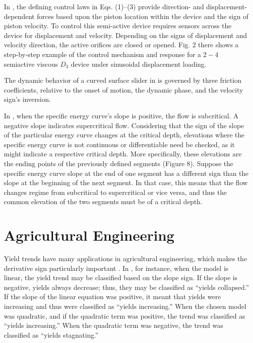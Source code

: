 \documentclass[11pt]{book}
\begin{document}
In \cite{hazaveh2017experimental}, the defining control laws in Eqs.
(1)--(3) provide direction- and displacement-dependent forces based
upon the piston location within the device and the sign of piston
velocity. To control this semi-active device requires sensors across
the device for displacement and velocity. Depending on the signs of
displacement and velocity direction, the active orifices are closed
or opened. Fig. 2 there shows a step-by-step example of the control
mechanism and response for a $2-4$ semiactive viscous $D_{3}$ device
under sinusoidal displacement loading.

The dynamic behavior of a curved surface slider in \cite{saitta2018base}
is governed by three friction coefficients, relative to the onset
of motion, the dynamic phase, and the velocity sign's inversion.

In \cite{petikas2020calculation}, when the specific energy curve's
slope is positive, the flow is subcritical. A negative slope indicates
supercritical flow. Considering that the sign of the slope of the
particular energy curve changes at the critical depth, elevations
where the specific energy curve is not continuous or differentiable
need be checked, as it might indicate a respective critical depth.
More specifically, these elevations are the ending points of the previously
defined segments (Figure 8). Suppose the specific energy curve slope
at the end of one segment has a different sign than the slope at the
beginning of the next segment. In that case, this means that the flow
changes regime from subcritical to supercritical or vice versa, and
thus the common elevation of the two segments must be of a critical
depth.


\section{Agricultural Engineering}
Yield trends have many applications in agricultural engineering, which makes the derivative sign particularly important . In \cite{zymaroieva2020spatial}, for instance, when the model is linear, the yield trend may be classified based on the slope sign. If the slope is negative, yields always decrease; thus, they may be classified as ``yields collapsed.'' If the slope of the linear equation was positive, it meant that yields were increasing and thus were classified  as ``yields increasing.'' When the chosen model was quadratic, and if the quadratic term was positive, the trend was classified as ``yields increasing.'' When the quadratic term was negative, the trend was classified as ``yields stagnating.''
	
\end{document}

